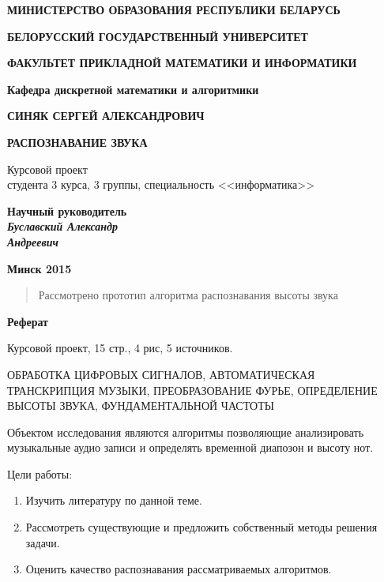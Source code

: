 \documentclass[oneside, final, 14pt]{extarticle}
\begin{document}
\begin{titlepage}


\centerline{\bf МИНИСТЕРСТВО ОБРАЗОВАНИЯ РЕСПУБЛИКИ БЕЛАРУСЬ}
\bigskip
\bigskip
\centerline{\bf БЕЛОРУССКИЙ ГОСУДАРСТВЕННЫЙ УНИВЕРСИТЕТ}
\bigskip
\bigskip
\centerline{\bf ФАКУЛЬТЕТ ПРИКЛАДНОЙ МАТЕМАТИКИ И ИНФОРМАТИКИ}
\bigskip
\bigskip
\centerline{\bf Кафедра дискретной математики и алгоритмики}
\vfill
\vfill
\vfill
\centerline{\bf СИНЯК СЕРГЕЙ АЛЕКСАНДРОВИЧ}
\bigskip
\bigskip
\centerline{\large \bf РАСПОЗНАВАНИЕ ЗВУКА}
\vfill
\begin{centering}
  {
  Курсовой проект \\
  студента 3 курса, 3 группы, специальность <<информатика>> \\}
\end{centering}
\vfill
\vfill
\hfill
\begin{minipage}{0.35\textwidth}
  {\bf Научный руководитель \\
  {\small{\it Буславский Александр \\ Андреевич}}}
\end{minipage}
\vfill
\vfill
\centerline{\large \bf Минск 2015}

\restoregeometry

\end{titlepage}

\begin{abstract}
  Рассмотрено прототип алгоритма распознавания высоты звука
\end{abstract}

\setcounter{page}{2}

\cleardoublepage

\centerline{\bf Реферат}

Курсовой проект, 15 стр., 4 рис, 5 источников.

ОБРАБОТКА ЦИФРОВЫХ СИГНАЛОВ, АВТОМАТИЧЕСКАЯ ТРАНСКРИПЦИЯ МУЗЫКИ,
ПРЕОБРАЗОВАНИЕ ФУРЬЕ, ОПРЕДЕЛЕНИЕ ВЫСОТЫ ЗВУКА, ФУНДАМЕНТАЛЬНОЙ
ЧАСТОТЫ

Объектом исследования являются алгоритмы позволяющие анализировать
музыкальные аудио записи и определять временной диапозон и высоту
нот.

Цели работы:
\begin{enumerate}
  \item Изучить литературу по данной теме.
  \item Рассмотреть существующие и предложить собственный методы решения
  задачи.
  \item Оценить качество распознавания рассматриваемых алгоритмов.
\end{enumerate}
\end{document}
